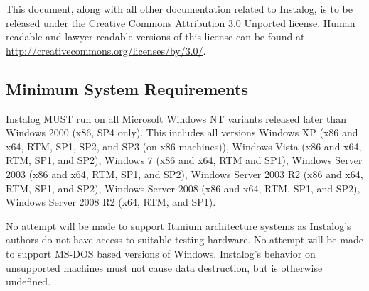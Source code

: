 This document, along with all other documentation related to Instalog,  is to be
released under the Creative Commons Attribution 3.0 Unported license. Human
readable and lawyer readable versions of this license can be found at
\url{http://creativecommons.org/licenses/by/3.0/}.

\subsection{Minimum System Requirements}
Instalog MUST run on all Microsoft Windows NT variants released later than
Windows 2000 (x86, SP4 only). This includes all versions Windows XP (x86 and
x64, RTM, SP1, SP2, and SP3 (on x86 machines)), Windows Vista (x86 and x64, RTM,
SP1, and SP2), Windows 7 (x86 and x64, RTM and SP1), Windows Server 2003 (x86
and x64, RTM, SP1, and SP2), Windows Server 2003 R2 (x86 and x64, RTM, SP1, and
SP2), Windows Server 2008 (x86 and x64, RTM, SP1, and SP2), Windows Server 2008
R2 (x64, RTM, and SP1).

No attempt will be made to support Itanium architecture systems as Instalog's
authors do not have access to suitable testing hardware. No attempt will be made
to support MS-DOS based versions of Windows. Instalog's behavior on unsupported
machines must not cause data destruction, but is otherwise undefined.